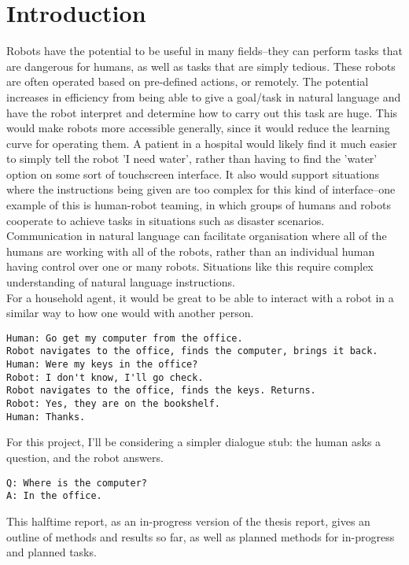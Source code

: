 \chapter{Introduction}
Robots have the potential to be useful in many fields–they can perform tasks that are dangerous for humans, as well as tasks that are simply tedious. These robots are often operated based on pre-defined actions, or remotely. The potential increases in efficiency from being able to give a goal/task in natural language and have the robot interpret and determine how to carry out this task are huge. This would make robots more accessible generally, since it would reduce the learning curve for operating them. A patient in a hospital would likely find it much easier to simply tell the robot 'I need water', rather than having to find the 'water' option on some sort of touchscreen interface. It also would support situations where the instructions being given are too complex for this kind of interface--one example of this is human-robot teaming, in which groups of humans and robots cooperate to achieve tasks in situations such as disaster scenarios\cite{Kruijff-Korbayova:2015aa}. Communication in natural language can facilitate organisation where all of the humans are working with all of the robots, rather than an individual human having control over one or many robots. Situations like this require complex understanding of natural language instructions. \\
For a household agent, it would be great to be able to interact with a robot in a similar way to how one would with another person. 
\begin{verbatim}
Human: Go get my computer from the office. 
Robot navigates to the office, finds the computer, brings it back. 
Human: Were my keys in the office?
Robot: I don't know, I'll go check. 
Robot navigates to the office, finds the keys. Returns.
Robot: Yes, they are on the bookshelf. 
Human: Thanks. 
\end{verbatim}
For this project, I'll be considering a simpler dialogue stub: the human asks a question, and the robot answers. %
\begin{verbatim}
Q: Where is the computer?
A: In the office. 
\end{verbatim}

This halftime report, as an in-progress version of the thesis report, gives an outline of methods and results so far, as well as planned methods for in-progress and planned tasks. 
